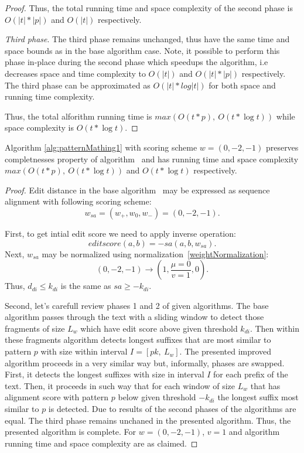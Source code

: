 \begin{proof}
Thus, the total running time and space complexity of the second phase is $O(|t|*|p|)$ and $O(|t|)$ respectively.

\emph{Third phase}.
The third phase remains unchanged, thus have the same time and space bounds as in the base algorithm case.
Note, it possible to perform this phase in-place during the second phase which speedups the algorithm, i.e decreases space and time complexity to $O(|t|)$ and $O(|t|*|p|)$ respectively.
The third phase can be approximated as $O(|t| * log|t|)$ for both space and running time complexity.

Thus, the total alforithm running time is $max(O(t * p),\ O(t * \log t))$ while space complexity is $O(t * \log t)$.
\end{proof}

\begin{theorem}
Algorithm \ref{alg:patternMathing1} with scoring scheme $w = (0,-2,-1)$ preserves completnesses property of algorithm~\cite{luciv2019interactive} and has running time and space complexity $max(O(t*p),\ O(t* \log t))$ and $O(t *  \log t)$  respectively.
\end{theorem}

\begin{proof}
Edit distance in the base algorithm~\cite{.} may be expressed as sequence alignment with following scoring scheme: 
$$w_{sa}=(w_{+},w_{0},w_{-}) = (0,-2,-1).$$

First, to get intial edit score we need to apply inverse operation:
$$editscore(a,b) = -sa(a,b,w_{sa}).$$
Next, $w_{sa}$ may be normalized using normalization~\ref{weightNormalization}:
$$(0, -2, -1) \rightarrow (1,\frac{\mu=0}{v=1}, 0).$$
Thus, $d_{di} \leq k_{di}$ is the same as $sa \geq -k_{di}$.

Second, let's carefull review phases 1 and 2 of given algorithms.
The base algorithm passes through the text with a sliding window to detect those fragments of size $L_{w}$ which have edit score above given threshold $k_{di}$.
Then within these fragments algorithm detects longest suffixes that are most similar to pattern $p$ with size within interval $I=[pk,\ L_{w}]$.
The presented improved algorithm proceeds in a very similar way but, informally, phases are swapped.
First, it detects the longest suffixes with size in interval $I$ for each prefix of the text.
Then, it proceeds in such way that for each window of size $L_{w}$ that has alignment score with pattern $p$ below given threshold $-k_{di}$  the longest suffix most similar to $p$ is detected.
Due to  results of the second phases of the algorithms are equal.
The third phase remains unchaned in the presented algorithm.
Thus, the presented algorithm is complete.
For $w = (0,-2,-1)$, $v=1$ and algorithm running time and space complexity are as claimed.
\end{proof}

